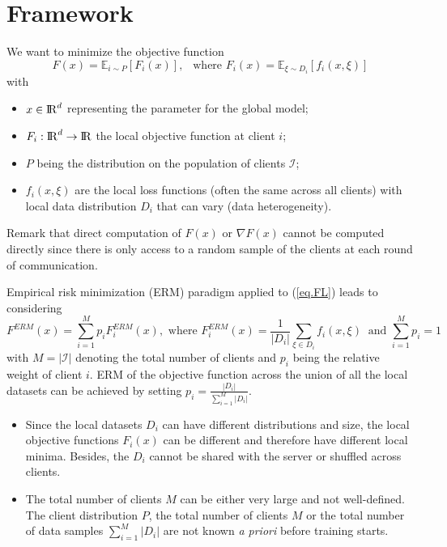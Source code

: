 \documentclass[10pt,a4paper]{book}
\theoremstyle{definition}
\theoremstyle{plain}
\theoremstyle{remark}
\newcommand \Esp {\mathbb{E}}
\def\R{{\rm I\kern-0.16em R}}
\begin{document}
\section{Framework}
We want to minimize the objective function
\begin{equation}\label{eq.FL}
F(x)=\Esp_{i\sim P}[F_i(x)],~~\text{ where }F_i(x)=\Esp_{\xi\sim D_i}[f_i(x,\xi)]
\end{equation}
with 
\begin{itemize}
\item $x\in \R^d$ representing the parameter for the global model;
\item $F_i: \R^d\to \R$ the local objective function at client $i$;
\item $P$ being the distribution on the population of clients $\mathcal{I}$;
\item $f_i(x,\xi)$ are the local loss functions (often the same across all clients) with local data distribution $D_i$ that can vary (data heterogeneity).
\end{itemize}
Remark that direct computation of $F(x)$ or $\nabla F(x)$ cannot be computed directly since there is only access to a random sample of the clients at each round of communication. \par \medskip
Empirical risk minimization (ERM) paradigm applied to (\ref{eq.FL}) leads to considering
$$F^{ERM}(x)=\sum_{i=1}^{M}p_iF_i^{ERM}(x), \text{ where } F_i^{ERM}(x)=\frac{1}{|D_i|}\sum_{\xi \in D_i}f_i(x,\xi)~\text{ and }\sum_{i=1}^{M}p_i=1$$
with $M=|\mathcal{I}|$ denoting the total number of clients and $p_i$ being the relative weight of client $i$. ERM of the objective function across the union of all the local datasets can be achieved by setting $p_i=\frac{|D_i|}{\sum_{i=1}^{M}|D_i|}$. 

\begin{itemize}
\item Since the local datasets $D_i$ can have different distributions and size, the local objective functions $F_i(x)$ can be different and therefore have different local minima. Besides, the $D_i$ cannot be shared with the server or shuffled across clients.
\item The total number of clients $M$ can be either very large and not well-defined. The client distribution $P$, the total number of clients $M$ or the total number of data samples $\sum_{i=1}^{M}|D_i|$ are not known \emph{a priori} before training starts.
\end{itemize}
\end{document}

